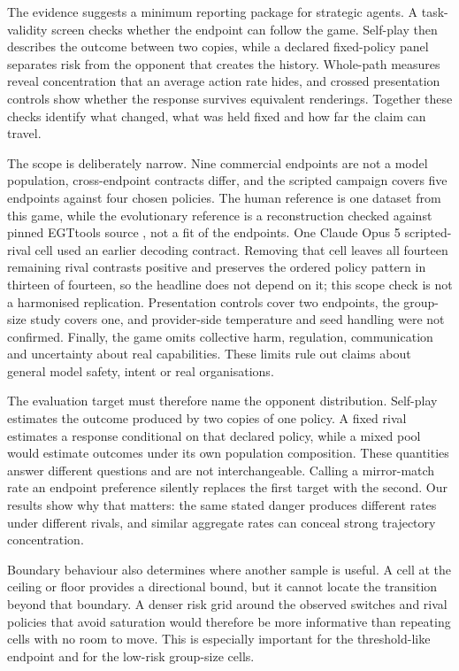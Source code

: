 \documentclass[sigconf,anonymous]{aamas}
\begin{document}
The evidence suggests a minimum reporting package for strategic agents. A
task-validity screen checks whether the endpoint can follow the game. Self-play
then describes the outcome
between two copies, while a declared fixed-policy panel separates risk from the
opponent that creates the history. Whole-path measures reveal concentration
that an average action rate hides, and crossed presentation controls show
whether the response survives equivalent renderings. Together these checks
identify what changed, what was held fixed and how far the claim can travel.

The scope is deliberately narrow. Nine commercial endpoints are not a model
population, cross-endpoint contracts differ, and the scripted campaign covers
five endpoints against four chosen policies. The human reference is one dataset
from this game, while the evolutionary reference is a reconstruction checked
against pinned EGTtools source \citep{fernandezDomingos2020Egttools}, not a fit of
the endpoints. One Claude Opus 5 scripted-rival cell used an earlier decoding
contract. Removing that cell leaves all fourteen remaining rival contrasts
positive and preserves the ordered policy pattern in thirteen of fourteen, so
the headline does not depend on it; this scope check is not a harmonised
replication. Presentation controls cover two endpoints, the group-size study
covers one, and provider-side temperature and seed handling were not confirmed.
Finally, the game omits collective harm, regulation, communication and uncertainty
about real capabilities. These limits rule out claims about general model safety,
intent or real organisations.

The evaluation target must therefore name the opponent distribution. Self-play
estimates the outcome produced by two copies of one policy. A fixed rival
estimates a response conditional on that declared policy, while a mixed pool
would estimate outcomes under its own population composition. These quantities
answer different questions and are not interchangeable. Calling a mirror-match
rate an endpoint preference silently replaces the first target with the second.
Our results show why that matters: the same stated danger produces different
rates under different rivals, and similar aggregate rates can conceal strong
trajectory concentration.

Boundary behaviour also determines where another sample is useful. A cell at
the ceiling or floor provides a directional bound, but it cannot locate the
transition beyond that boundary. A denser risk grid around the observed switches
and rival policies that avoid saturation would therefore be more informative
than repeating cells with no room to move. This is especially important for the
threshold-like endpoint and for the low-risk group-size cells.
\end{document}
